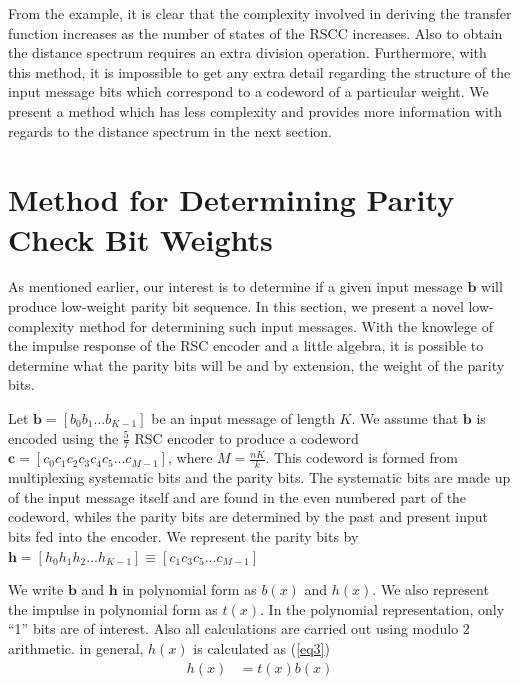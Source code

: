 \documentclass[fontsize=12pt]{article}
\begin{document}
From the example, it is clear that the complexity involved in deriving the transfer function increases as the number of states of the RSCC increases. Also to obtain the distance spectrum requires an extra division operation. Furthermore, with this method, it is impossible to get any extra detail regarding the structure of the input message bits which correspond to a codeword of a particular weight. We present a method which has less complexity and provides more information with regards to the distance spectrum in the next section.

\section{Method for Determining Parity Check Bit Weights}
\label{sec4}
As mentioned earlier, our interest is to determine if a given input message $\textbf{b}$ will produce low-weight parity bit sequence. In this section, we present a novel low-complexity method for determining such input messages. With the knowlege of the impulse response of the  RSC encoder and a little algebra, it is possible to determine what the parity bits will be and by extension, the weight of the parity bits. 

Let $\textbf{b} =[b_0 b_1 ... b_{K-1}]$ be an input message of length $K$. We assume that $\textbf{b}$ is encoded using the $\frac{5}{7}$ RSC encoder to produce a codeword $\textbf{c}=[c_0 c_1 c_2 c_3 c_4 c_5 ... c_{M-1}]$, where $M=\frac{nK}{k}$. This codeword is formed from multiplexing  systematic bits and the parity bits. The systematic bits are made up of the input message itself and are found in the even numbered part of the codeword, whiles the parity bits are determined by the past and present input bits fed into the encoder. 
We represent the parity bits by 
$\textbf{h}=[h_0 h_1 h_2 ... h_{K-1}] \equiv [c_1 c_3 c_5 ... c_{M-1}]$

 We write $\textbf{b}$ and $\textbf{h}$ in polynomial form as $b(x)$ and $h(x)$. We also represent the impulse in polynomial form as $t(x)$. In the polynomial representation, only ``1'' bits are of interest. Also all calculations are carried out using modulo 2 arithmetic.
in general, $h(x)$ is calculated as (\ref{eq3})
 \begin{equation}
 \begin{split}
 h(x)&=t(x)b(x)\\
 \end{split}
 \label{eq3}
 \end{equation}
 
\end{document}
